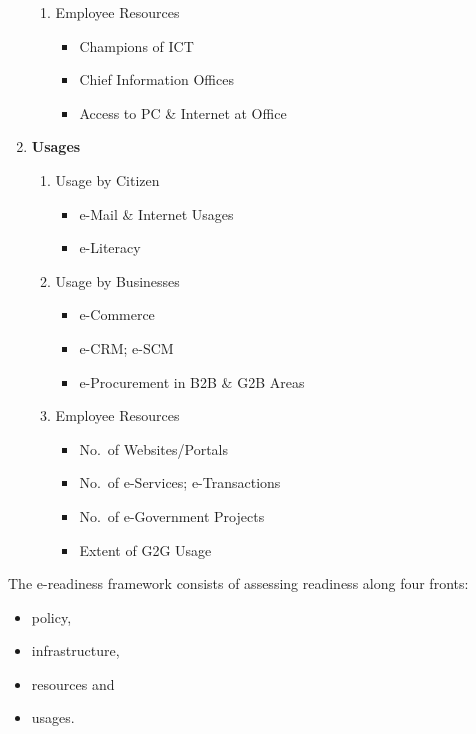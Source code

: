 \begin{enumerate}
\begin{enumerate}
		      \item Employee Resources
		            \begin{itemize}
			            \item Champions of ICT
			            \item Chief Information Offices
			            \item Access to PC \& Internet at Office
		            \end{itemize}
	      \end{enumerate}

	\item \textbf{Usages}
	      \begin{enumerate}
		      \item Usage by Citizen
		            \begin{itemize}
			            \item e-Mail \& Internet Usages
			            \item e-Literacy

		            \end{itemize}

		      \item Usage by Businesses
		            \begin{itemize}
			            \item e-Commerce
			            \item e-CRM; e-SCM
			            \item e-Procurement in B2B \& G2B Areas
		            \end{itemize}

		      \item Employee Resources
		            \begin{itemize}
			            \item No.\ of Websites/Portals
			            \item No.\ of e-Services; e-Transactions
			            \item No.\ of e-Government Projects
			            \item Extent of G2G Usage
		            \end{itemize}
	      \end{enumerate}
\end{enumerate}

The e-readiness framework consists of assessing readiness along four fronts:
\begin{itemize}
	\item policy,
	\item infrastructure,
	\item resources and
	\item usages.
\end{itemize}

